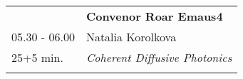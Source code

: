 \begin{longtable}{p{3cm}p{13cm}}
&\hfill {\bf Convenor Roar Emaus4 }\\ 
05.30 - 06.00 & Natalia Korolkova\\ 
25+5 min. & {\it Coherent Diffusive Photonics}\\ 
 & \\ 
\end{longtable}

